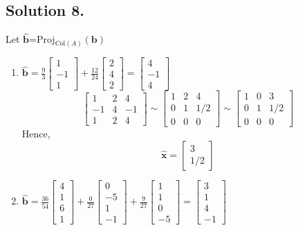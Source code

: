 \documentclass{article}
\begin{document}
\subsection*{Solution 8.}
Let $\mathbf{\hat{b}}$=Proj$_{\text{Col}(A)}(\mathbf{b})$
\begin{enumerate} [label=(\arabic*)]
    \item $\mathbf{\hat{b}}=\frac{9}{3}\left[\begin{array}{r}1\\-1\\1\end{array}\right]+\frac{12}{24}\left[\begin{array}{r}2\\4\\2\end{array}\right]=\left[\begin{array}{r}4\\-1\\4\end{array}\right]$
    \[\left[\begin{array}{rrr}
    1 & 2 & 4 \\
    -1& 4 &-1 \\
    1 & 2 & 4
    \end{array}\right]\sim
    \left[\begin{array}{rrr}
    1 & 2 & 4 \\
    0 & 1 & 1/2\\
    0 & 0& 0
    \end{array}\right]\sim
    \left[\begin{array}{rrr}
    1 & 0 & 3 \\
    0 & 1 & 1/2\\
    0 & 0 & 0
    \end{array}\right]
    \]
    Hence,
    \[\mathbf{\hat{x}}=\left[\begin{array}{r}3\\1/2\end{array}\right]\]
    \item $\mathbf{\hat{b}}=\frac{36}{54}\left[\begin{array}{r}4\\1\\6\\1\end{array}\right]+\frac{0}{27}\left[\begin{array}{r}0\\-5\\1\\-1\end{array}\right]+\frac{9}{27}\left[\begin{array}{r}1\\1\\0\\-5\end{array}\right]=\left[\begin{array}{r}3\\1\\4\\-1\end{array}\right]$

\end{enumerate}
\end{document}
